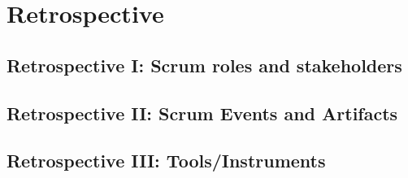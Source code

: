 \section{Retrospective}\label{sec:retrorespective}

\subsection{Retrospective I: Scrum roles and stakeholders}\label{subsec:retrospective-scrum-roles-and-stakeholder}


\subsection{Retrospective II: Scrum Events and Artifacts}\label{subsec:retrospective-scrum-events-and-artifacts}


\subsection{Retrospective III: Tools/Instruments}\label{subsec:retrospective-tools-instruments}


